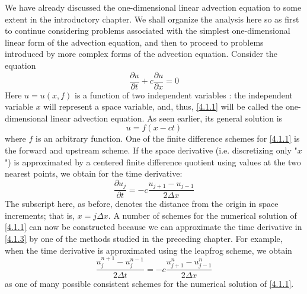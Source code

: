 We have already discussed the one-dimensional linear advection equation to some extent in the introductory chapter. We shall organize the analysis here so as first to continue considering problems associated with the simplest one-dimensional linear form of the advection equation, and then to proceed to problems introduced by more complex forms of the advection equation.
Consider the equation
\begin{equation}\label{4.1.1}
	\frac{\partial u}{\partial t}+c\frac{\partial u}{\partial x}=0
\end{equation}
Here $u=u(x,f)$ is a function of two independent variables : the independent variable $x$ will represent a space variable, and, thus, \ref{4.1.1} will be called the one-dimensional linear advection equation. As seen earlier, its general solution is
$$u=f(x-ct)$$ where $f$ is an arbitrary function.
One of the finite difference schemes for \ref{4.1.1} is the forward and upstream scheme. If the space derivative (i.e. discretizing only "$x$") is approximated by a centered finite difference quotient using values at the two nearest points, we obtain for the time derivative:
\begin{equation}\label{4.1.3}
	\frac{\partial u_j}{\partial t}=-c\frac{u_{j+1}-u_{j-1}}{2\Delta x}
\end{equation}
The subscript here, as before, denotes the distance from the origin in space increments; that is, $x=j\Delta x$. A number of schemes for the numerical solution of \ref{4.1.1} can now be constructed because we can approximate the time derivative in \ref{4.1.3} by one of the methods studied in the preceding chapter. For example, when the time derivative is approximated using the leapfrog scheme, we obtain
\begin{equation}\label{4.1.4}
	\frac{u^{n+1}_j-u^{n-1}_j}{2\Delta t}=-c\frac{u_{j+1}^n-u_{j-1}^n}{2\Delta x}
\end{equation}
as one of many possible consistent schemes for the numerical solution of \ref{4.1.1}.

